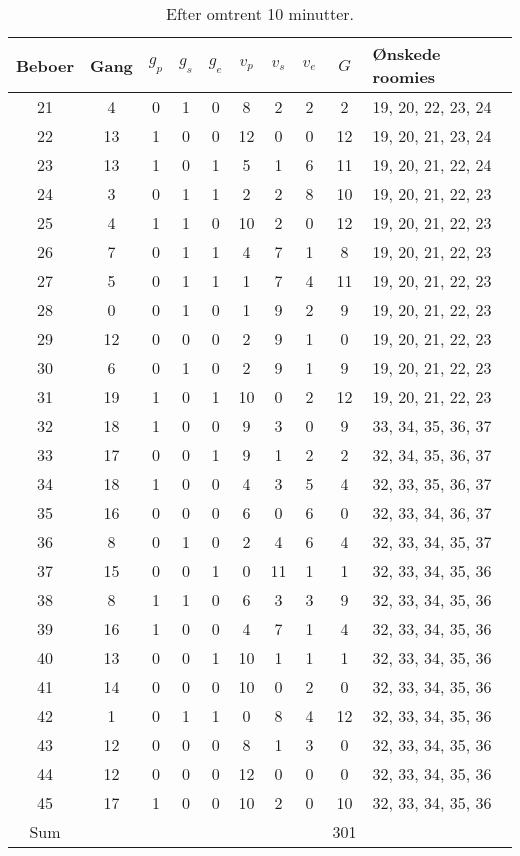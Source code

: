 \documentclass[article,oneside,11pt,a4paper]{memoir}
\newenvironment{assignment}[1]{
\begin{table}[h]
\caption{#1}
\footnotesize
\begin{center}
\begin{tabular}{cccccccccl}
\toprule
Beboer & Gang & $g_p$ & $g_s$ & $g_e$ & $v_p$ & $v_s$ & $v_e$ & $G$ & Ønskede roomies \\ \midrule
}{
\bottomrule
\end{tabular}
\end{center}
\end{table}

}
\begin{document}
\begin{assignment}{Efter omtrent 10 minutter.}
    21 &    4 &   0 &   1 &   0 &   8 &   2 &   2 &  2 & 19, 20, 22, 23, 24 \\
    22 &   13 &   1 &   0 &   0 &  12 &   0 &   0 & 12 & 19, 20, 21, 23, 24 \\
    23 &   13 &   1 &   0 &   1 &   5 &   1 &   6 & 11 & 19, 20, 21, 22, 24 \\
    24 &    3 &   0 &   1 &   1 &   2 &   2 &   8 & 10 & 19, 20, 21, 22, 23 \\
    25 &    4 &   1 &   1 &   0 &  10 &   2 &   0 & 12 & 19, 20, 21, 22, 23 \\
    26 &    7 &   0 &   1 &   1 &   4 &   7 &   1 &  8 & 19, 20, 21, 22, 23 \\
    27 &    5 &   0 &   1 &   1 &   1 &   7 &   4 & 11 & 19, 20, 21, 22, 23 \\
    28 &    0 &   0 &   1 &   0 &   1 &   9 &   2 &  9 & 19, 20, 21, 22, 23 \\
    29 &   12 &   0 &   0 &   0 &   2 &   9 &   1 &  0 & 19, 20, 21, 22, 23 \\
    30 &    6 &   0 &   1 &   0 &   2 &   9 &   1 &  9 & 19, 20, 21, 22, 23 \\
    31 &   19 &   1 &   0 &   1 &  10 &   0 &   2 & 12 & 19, 20, 21, 22, 23 \\ \midrule
    32 &   18 &   1 &   0 &   0 &   9 &   3 &   0 &  9 & 33, 34, 35, 36, 37 \\
    33 &   17 &   0 &   0 &   1 &   9 &   1 &   2 &  2 & 32, 34, 35, 36, 37 \\
    34 &   18 &   1 &   0 &   0 &   4 &   3 &   5 &  4 & 32, 33, 35, 36, 37 \\
    35 &   16 &   0 &   0 &   0 &   6 &   0 &   6 &  0 & 32, 33, 34, 36, 37 \\
    36 &    8 &   0 &   1 &   0 &   2 &   4 &   6 &  4 & 32, 33, 34, 35, 37 \\
    37 &   15 &   0 &   0 &   1 &   0 &  11 &   1 &  1 & 32, 33, 34, 35, 36 \\
    38 &    8 &   1 &   1 &   0 &   6 &   3 &   3 &  9 & 32, 33, 34, 35, 36 \\
    39 &   16 &   1 &   0 &   0 &   4 &   7 &   1 &  4 & 32, 33, 34, 35, 36 \\
    40 &   13 &   0 &   0 &   1 &  10 &   1 &   1 &  1 & 32, 33, 34, 35, 36 \\
    41 &   14 &   0 &   0 &   0 &  10 &   0 &   2 &  0 & 32, 33, 34, 35, 36 \\
    42 &    1 &   0 &   1 &   1 &   0 &   8 &   4 & 12 & 32, 33, 34, 35, 36 \\
    43 &   12 &   0 &   0 &   0 &   8 &   1 &   3 &  0 & 32, 33, 34, 35, 36 \\
    44 &   12 &   0 &   0 &   0 &  12 &   0 &   0 &  0 & 32, 33, 34, 35, 36 \\
    45 &   17 &   1 &   0 &   0 &  10 &   2 &   0 & 10 & 32, 33, 34, 35, 36 \\ \midrule
Sum &&&&&&&& 301 & \\
\end{assignment}
\end{document}
